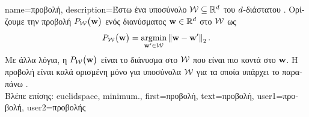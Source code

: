  {name={\foreignlanguage{greek}{προβολή}}, 
       description={\foreignlanguage{greek}{Έστω ένα υποσύνολο} $\mathcal{W} \subseteq \mathbb{R}^{d}$ 
       		\foreignlanguage{greek}{του $d$-διάστατου} . \foreignlanguage{greek}{Ορίζουμε την προβολή 
		$P_{\mathcal{W}}\big( {\bf w}\big)$ ενός διανύσματος ${\bf w} \in \mathbb{R}^{d}$ στο $\mathcal{W}$ ως}
		\begin{equation} 
   	    \label{equ_def_proj_generic_dict}
  	     P_{\mathcal{W}}\big( {\bf w}\big) = \operatorname*{argmin}_{{\bf w}' \in \mathcal{W}} \left\Vert {{\bf w}- {\bf w}'} \right\Vert_{2}. 
         \end{equation}
		 \foreignlanguage{greek}{Με άλλα λόγια, η $P_{\mathcal{W}}\big( {\bf w}\big)$ είναι το διάνυσμα στο $\mathcal{W}$ που είναι 
		 πιο κοντά στο ${\bf w}$. Η προβολή είναι καλά ορισμένη μόνο για υποσύνολα $\mathcal{W}$ για τα οποία 
		 υπάρχει το παραπάνω}  \cite{BoydConvexBook}.\\
		 \foreignlanguage{greek}{Βλέπε επίσης:} \gls{euclidspace}, \gls{minimum}.},
		 first={\foreignlanguage{greek}{προβολή}},
		 text={\foreignlanguage{greek}{προβολή}},
		 user1={\foreignlanguage{greek}{προβολή}}, %
		 user2={\foreignlanguage{greek}{προβολής}} %
}

